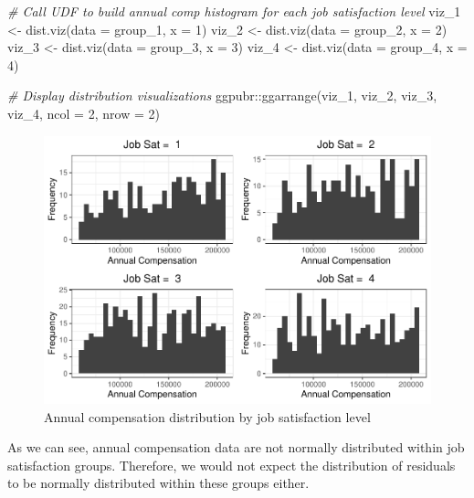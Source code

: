 \documentclass[
]{book}
\newenvironment{Shaded}{\begin{snugshade}}{\end{snugshade}}
\newcommand{\AttributeTok}[1]{\textcolor[rgb]{0.77,0.63,0.00}{#1}}
\newcommand{\CommentTok}[1]{\textcolor[rgb]{0.56,0.35,0.01}{\textit{#1}}}
\newcommand{\DecValTok}[1]{\textcolor[rgb]{0.00,0.00,0.81}{#1}}
\newcommand{\FunctionTok}[1]{\textcolor[rgb]{0.00,0.00,0.00}{#1}}
\newcommand{\NormalTok}[1]{#1}
\newcommand{\OtherTok}[1]{\textcolor[rgb]{0.56,0.35,0.01}{#1}}
\newcommand{\SpecialCharTok}[1]{\textcolor[rgb]{0.00,0.00,0.00}{#1}}
\begin{document}
\begin{Shaded}
\begin{Highlighting}[]
\CommentTok{\# Call UDF to build annual comp histogram for each job satisfaction level}
\NormalTok{viz\_1 }\OtherTok{\textless{}{-}} \FunctionTok{dist.viz}\NormalTok{(}\AttributeTok{data =}\NormalTok{ group\_1, }\AttributeTok{x =} \DecValTok{1}\NormalTok{)}
\NormalTok{viz\_2 }\OtherTok{\textless{}{-}} \FunctionTok{dist.viz}\NormalTok{(}\AttributeTok{data =}\NormalTok{ group\_2, }\AttributeTok{x =} \DecValTok{2}\NormalTok{)}
\NormalTok{viz\_3 }\OtherTok{\textless{}{-}} \FunctionTok{dist.viz}\NormalTok{(}\AttributeTok{data =}\NormalTok{ group\_3, }\AttributeTok{x =} \DecValTok{3}\NormalTok{)}
\NormalTok{viz\_4 }\OtherTok{\textless{}{-}} \FunctionTok{dist.viz}\NormalTok{(}\AttributeTok{data =}\NormalTok{ group\_4, }\AttributeTok{x =} \DecValTok{4}\NormalTok{)}

\CommentTok{\# Display distribution visualizations}
\NormalTok{ggpubr}\SpecialCharTok{::}\FunctionTok{ggarrange}\NormalTok{(viz\_1, viz\_2, viz\_3, viz\_4,}
          \AttributeTok{ncol =} \DecValTok{2}\NormalTok{, }\AttributeTok{nrow =} \DecValTok{2}\NormalTok{)}
\end{Highlighting}
\end{Shaded}

\begin{figure}

{\centering \includegraphics{The_Fundamentals_of_People_Analytics_files/figure-latex/comp-dist-1} 

}

\caption{Annual compensation distribution by job satisfaction level}\label{fig:comp-dist}
\end{figure}

As we can see, annual compensation data are not normally distributed within job satisfaction groups. Therefore, we would not expect the distribution of residuals to be normally distributed within these groups either.
\end{document}
